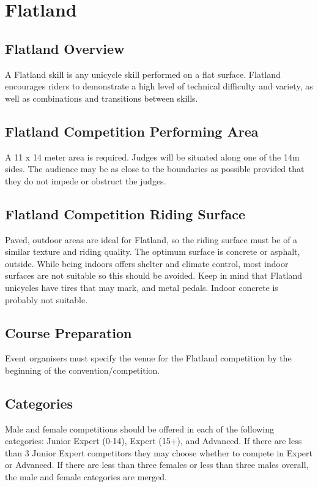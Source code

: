\chapter{Flatland}

\section{Flatland Overview \label{sec:flat-street_flatland-overview}}
A Flatland skill is any unicycle skill performed on a flat surface.
Flatland encourages riders to demonstrate a high level of technical difficulty and variety, as well as combinations and transitions between skills.

\section{Flatland Competition Performing Area \label{sec:flat-street_flatland-performing-area}}
A 11 x 14 meter area is required.
Judges will be situated along one of the 14m sides.
The audience may be as close to the boundaries as possible provided that they do not impede or obstruct the judges.

\section{Flatland Competition Riding Surface}
Paved, outdoor areas are ideal for Flatland, so the riding surface must be of a similar texture and riding quality.
The optimum surface is concrete or asphalt, outside.
While being indoors offers shelter and climate control, most indoor surfaces are not suitable so this should be avoided.
Keep in mind that Flatland unicycles have tires that may mark, and metal pedals. Indoor concrete is probably not suitable.

\section{Course Preparation}
Event organisers must specify the venue for the Flatland competition by the beginning of the convention/competition.

\section{Categories}
Male and female competitions should be offered in each of the following categories: Junior Expert (0-14), Expert (15+), and Advanced.
If there are less than 3 Junior Expert competitors they may choose whether to compete in Expert or Advanced.
If there are less than three females or less than three males overall, the male and female categories are merged.

